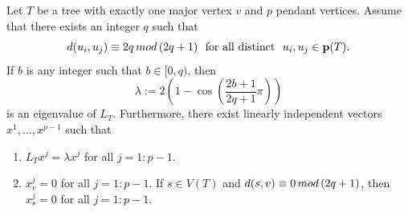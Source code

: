 \documentclass[10pt,a4paper]{amsart}
\def\pt{\mathbf{p}}
\begin{document}
\begin{lemma}\label{lem6base}
Let $T$ be a tree with exactly one major vertex $v$
and $p$ pendant vertices.
Assume that there exists an integer $q$ 
such that
\[d(u_i,u_j)\equiv 2q\,{\rm{mod}}\,(2q+1)~~\mbox{for all distinct}~~u_i,u_j \in \pt(T).
\]
If $b$ is any integer such that $b \in [0,q)$, then
\[\lambda:=2\left(1- \cos \left(\frac{2b+1}{2q+1}\pi\right) \right)\]
is an eigenvalue of $L_T$. Furthermore,
there exist linearly independent vectors $x^1,\dots,x^{p-1}$
such that 
\begin{enumerate}
\item[\rm (a)] $L_Tx^j=\lambda x^j$ for all $j=1:p-1$.
\item[{\rm (b)}] %
$x^j_{v}=0$ for all $j=1:p-1$. If $s \in V(T)$ and
$d(s,v) \equiv 0\,{\rm{mod}}\,(2q+1)$, then $x^j_{s}=0$ for all $j=1:p-1$. 
\end{enumerate}
\end{lemma}
\end{document}
